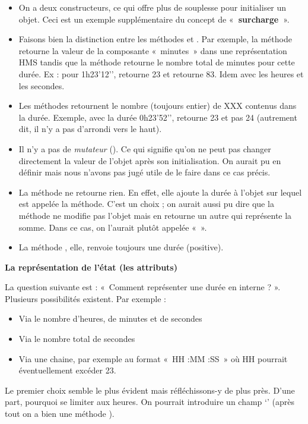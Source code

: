 \liststyleListv
\begin{itemize}
	\item {
	On a deux constructeurs, ce qui offre plus de souplesse pour initialiser
	un objet. Ceci est un exemple supplémentaire du concept de
	«\textbf{~surcharge~}».}
	\item {
	Faisons bien la distinction entre les méthodes
	 et . Par
	exemple, la méthode  retourne la valeur
	de la composante «~minutes~» dans une représentation HMS tandis que la
	méthode  retourne le nombre total
	de minutes pour cette durée. Ex : pour 1h23’12’’,
	 retourne 23 et
	 retourne 83. Idem avec les heures
	et les secondes.}
	\item {
	Les méthodes  retournent le nombre
	(toujours entier) de XXX contenus dans la durée. Exemple, avec la durée
	0h23’52'’, 
	retourne 23 et pas 24 (autrement dit, il n’y a pas d’arrondi vers le
	haut).}
	\item {
	Il n’y a pas de \textit{mutateur }(). Ce qui
	signifie qu’on ne peut pas changer directement la valeur de l’objet
	après son initialisation. On aurait pu en définir mais nous
	n'avons pas jugé utile de le faire dans ce cas
	précis.}
	\item {
	La méthode  ne retourne rien. En effet,
	elle ajoute la durée à l’objet sur lequel est appelée la méthode. C’est
	un choix ; on aurait aussi pu dire que la méthode ne modifie pas
	l’objet mais en retourne un autre qui représente la somme. Dans ce cas,
	on l’aurait plutôt appelée «~».}
	\item {
	La méthode , elle, renvoie toujours une
	durée (positive).}
\end{itemize}

{\sffamily\bfseries
La représentation de l'état (les attributs)}

{
La question suivante est : «~Comment représenter une durée en interne ?
». Plusieurs possibilités existent. Par exemple :}

\liststyleListv
\begin{itemize}
\item {
Via le nombre d’heures, de minutes et de secondes}
\item {
Via le nombre total de secondes}
\item {
Via une chaine, par exemple au format «~HH :MM :SS~» où HH pourrait
éventuellement excéder 23.}
\end{itemize}
{
Le premier choix semble le plus évident mais réfléchissons-y de plus
près. D’une part, pourquoi se limiter aux heures. On pourrait
introduire un champ ‘’ (après tout on a bien
une méthode ). }

